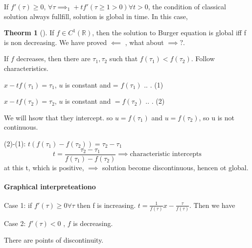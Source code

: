 \documentclass[a4paper]{article}
\theoremstyle{definition}
\newtheorem{theorem}{Theorm}[section]
\begin{document}
	If $f'\left( \tau \right) \ge 0$, $\forall \tau\implies_1+tf'\left( \tau\ge 1>0 \right) \forall t>0$, the condition of classical solution always fullfill, solution is global in time. In this case, 
	\begin{theorem}[]
		If $f\in C^{1}\left( \mathbb{R} \right) $, then the solution to Burger equation is global iff f is non decreasing. We have proved $\impliedby$ , what about $\implies?$. 

		If $f $ decreases, then there are $\tau_1,\tau_2$ such that $f\left( \tau_1 \right) <f\left( \tau_2 \right) $. Follow characteristics. 

		$x-tf\left( \tau_1 \right) =\tau_1$, $u$ is constant and = $f\left( \tau_1 \right) $ .. . (1)

		$x-tf\left( \tau_2 \right) =\tau_2$, $u$ is constant and $=f\left( \tau_2 \right) $ .. . (2) 

		We will hsow that they intercept. so $u=f\left( \tau_1  \right)  $ and $u=f\left( \tau_2  \right)$, so u is not continuous. 

		(2)-(1): $t\left( f\left( \tau_1 \right) -f\left( \tau_2 \right)  \right) =\tau_2-\tau_1$
		\begin{equation}
			t=\frac{\tau_2-\tau_1}{f\left( \tau_1 \right) -f\left( \tau_2 \right) }\implies \text{characteristic intercepts}
		\end{equation} 
		at this t, which is positive, $\implies $ solution become discontinuous, hencen ot global. 
	\end{theorem}
	\paragraph{Graphical interpreteationo}%
	Case 1: if $f'\left( \tau \right) \ge 0 \forall \tau$ then f is increasing. $t=\frac{1}{f\left( \tau \right) }x-\frac{\tau}{f\left( \tau \right) }$. 
	Then we have 
	
	Case 2: $f'\left( \tau  \right) <0$ , $f $ is decreasing. 
	There are points of discontinuity. 
\end{document}
